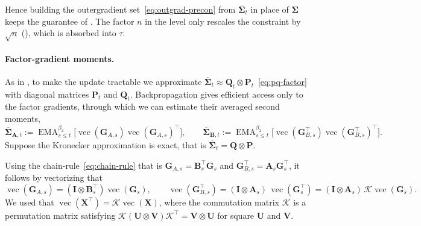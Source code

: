 \documentclass{article}
\renewcommand{\vec}{\operatorname{vec}}
\newcommand{\mat}[1]{\bm{#1}}
\DeclareMathOperator{\EMA}{EMA}
\begin{document}
Hence building the outergradient set~\eqref{eq:outgrad-precon} from $\overline{\mat{\Sigma}}_t$ in place of $\mat{\Sigma}$ keeps the guarantee of . The factor $n$ in the level only rescales the constraint by $\sqrt{n}$ (), which is absorbed into $\tau$.

\paragraph{Factor-gradient moments.}
As in , to make the update tractable we approximate $\overline{\mat{\Sigma}}_t \approx \mat{Q}_t \otimes \mat{P}_t$~\eqref{eq:pq-factor} with diagonal matrices $\mat{P}_t$ and $\mat{Q}_t$. Backpropagation gives efficient access only to the factor gradients, through which we can estimate their averaged second moments,
\begin{equation} \label{eq:factor-moments}
  \overline{\mat{\Sigma}}_{\mat{A},t}:=\EMA^{\beta_2}_{s\le t}\bigl[\vec(\mat{G}_{A,s})\vec(\mat{G}_{A,s})^\top\bigr],
  \qquad
  \overline{\mat{\Sigma}}_{\mat{B},t}:=\EMA^{\beta_2}_{s\le t}\bigl[\vec(\mat{G}_{B,s}^\top)\vec(\mat{G}_{B,s}^\top)^\top\bigr].
\end{equation}
Suppose the Kronecker approximation is exact, that is $\overline{\mat{\Sigma}}_t = \mat{Q} \otimes \mat{P}$.

Using the chain-rule~\eqref{eq:chain-rule} that is $\mat{G}_{A,s}=\mat{B}_s^\top \mat{G}_s$ and $\mat{G}_{B,s}^\top = \mat{A}_s \mat{G}_s^\top$, it follows by vectorizing that
\[
  \vec(\mat{G}_{A,s}) = (\mat{I} \otimes \mat{B}_s^\top)\vec(\mat{G}_s),
  \qquad
  \vec(\mat{G}_{B,s}^\top) = (\mat{I} \otimes \mat{A}_s)\,\vec(\mat{G}_s^\top)
    = (\mat{I} \otimes \mat{A}_s)\,\mathcal{K}\vec(\mat{G}_s).
\]
 We used that $\vec(\mat{X}^\top)=\mathcal{K}\vec(\mat{X})$, where the commutation matrix $\mathcal{K}$ is a permutation matrix satisfying $\mathcal{K}(\mat{U} \otimes \mat{V})\mathcal{K}^\top = \mat{V} \otimes \mat{U}$ for square $\mat{U}$ and $\mat{V}$.
\end{document}
